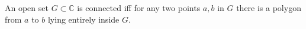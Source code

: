 An open set $G \subset \mathbb{C}$ is connected iff for any two points $a, b$ in $G$ there is a polygon from $a$ to $b$ lying entirely inside $G$.
